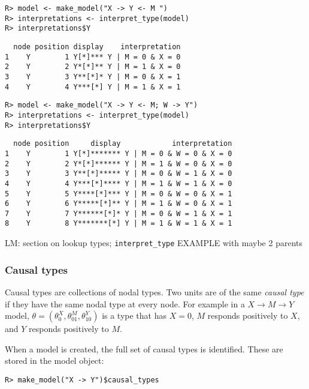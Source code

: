\documentclass[
  11pt,
  article]{jss}
\begin{document}
\begin{verbatim}
R> model <- make_model("X -> Y <- M ")
R> interpretations <- interpret_type(model)
R> interpretations$Y
\end{verbatim}

\begin{verbatim}
  node position display    interpretation
1    Y        1 Y[*]*** Y | M = 0 & X = 0
2    Y        2 Y*[*]** Y | M = 1 & X = 0
3    Y        3 Y**[*]* Y | M = 0 & X = 1
4    Y        4 Y***[*] Y | M = 1 & X = 1
\end{verbatim}

\begin{verbatim}
R> model <- make_model("X -> Y <- M; W -> Y")
R> interpretations <- interpret_type(model)
R> interpretations$Y
\end{verbatim}

\begin{verbatim}
  node position     display            interpretation
1    Y        1 Y[*]******* Y | M = 0 & W = 0 & X = 0
2    Y        2 Y*[*]****** Y | M = 1 & W = 0 & X = 0
3    Y        3 Y**[*]***** Y | M = 0 & W = 1 & X = 0
4    Y        4 Y***[*]**** Y | M = 1 & W = 1 & X = 0
5    Y        5 Y****[*]*** Y | M = 0 & W = 0 & X = 1
6    Y        6 Y*****[*]** Y | M = 1 & W = 0 & X = 1
7    Y        7 Y******[*]* Y | M = 0 & W = 1 & X = 1
8    Y        8 Y*******[*] Y | M = 1 & W = 1 & X = 1
\end{verbatim}

LM: section on lookup types; \texttt{interpret\_type} EXAMPLE with maybe
2 parents

\hypertarget{causal-types}{%
\subsubsection{Causal types}\label{causal-types}}

Causal types are collections of nodal types. Two units are of the same
\emph{causal type} if they have the same nodal type at every node. For
example in a \(X \rightarrow M \rightarrow Y\) model,
\(\theta = (\theta^X_0, \theta^M_{01}, \theta^Y_{10})\) is a type that
has \(X=0\), \(M\) responds positively to \(X\), and \(Y\) responds
positively to \(M\).

When a model is created, the full set of causal types is identified.
These are stored in the model object:

\begin{verbatim}
R> make_model("X -> Y")$causal_types
\end{verbatim}
\end{document}
